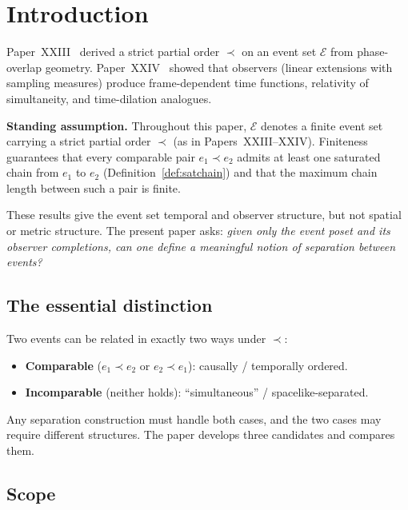 \documentclass[12pt]{article}
\newcommand{\Ecal}{\mathcal{E}}
\begin{document}
\section{Introduction}\label{sec:intro}

Paper~XXIII~\citep{SmartXXIII} derived a strict partial order $\prec$ on an event set $\Ecal$ from phase-overlap geometry. Paper~XXIV~\citep{SmartXXIV} showed that observers (linear extensions with sampling measures) produce frame-dependent time functions, relativity of simultaneity, and time-dilation analogues.

\medskip
\noindent\textbf{Standing assumption.} Throughout this paper, $\Ecal$ denotes a finite event set carrying a strict partial order $\prec$ (as in Papers~XXIII--XXIV). Finiteness guarantees that every comparable pair $e_1 \prec e_2$ admits at least one saturated chain from $e_1$ to $e_2$ (Definition~\ref{def:satchain}) and that the maximum chain length between such a pair is finite.
\medskip


These results give the event set temporal and observer structure, but not spatial or metric structure. The present paper asks: \textit{given only the event poset and its observer completions, can one define a meaningful notion of separation between events?}

\subsection*{The essential distinction}

Two events can be related in exactly two ways under $\prec$:
\begin{itemize}
    \item \textbf{Comparable} ($e_1 \prec e_2$ or $e_2 \prec e_1$): causally / temporally ordered.
    \item \textbf{Incomparable} (neither holds): ``simultaneous'' / spacelike-separated.
\end{itemize}

Any separation construction must handle both cases, and the two cases may require different structures. The paper develops three candidates and compares them.

\subsection*{Scope}
\end{document}
